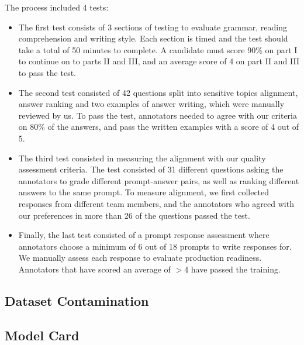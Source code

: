 The process included 4 tests:
\begin{itemize}
    \item The first test consists of 3 sections of testing to evaluate grammar, reading comprehension and writing style. Each section is timed and the test should take a total of 50 minutes to complete. A candidate must score 90\% on part I to continue on to parts II and III, and an average score of 4 on part II and III to pass the test.
    \item The second test consisted of 42 questions split into sensitive topics alignment, answer ranking and two examples of answer writing, which were manually reviewed by us. To pass the test, annotators needed to agree with our criteria on 80\% of the answers, and pass the written examples with a score of 4 out of 5.
    \item The third test consisted in measuring the alignment with our quality assessment criteria. The test consisted of 31 different questions asking the annotators to grade different prompt-answer pairs, as well as ranking different answers to the same prompt. To measure alignment, we first collected responses from different team members, and the annotators who agreed with our preferences in more than 26 of the questions passed the test.
    \item Finally, the last test consisted of a prompt response assessment where annotators choose a minimum of 6 out of 18 prompts to write responses for. We manually assess each response to evaluate production readiness. Annotators that have scored an average of $>$4 have passed the training. 
\end{itemize}


\subsection{Dataset Contamination}
\label{sec:dataset_contamination}
 

\subsection{Model Card}

